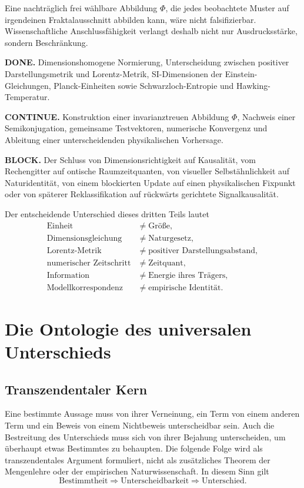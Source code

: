 \documentclass[11pt,a4paper]{article}
\theoremstyle{remark}
\newcommand{\statusbox}[2]{%
  \par\medskip\noindent
  \colorbox{#1}{\parbox{\dimexpr\linewidth-2\fboxsep\relax}{#2}}%
  \par\medskip
}
\begin{document}
Eine nachträglich frei wählbare Abbildung \(\Phi\), die jedes beobachtete
Muster auf irgendeinen Fraktalausschnitt abbilden kann, wäre nicht
falsifizierbar. Wissenschaftliche Anschlussfähigkeit verlangt deshalb nicht
nur Ausdrucksstärke, sondern Beschränkung.

\statusbox{QGreen}{
\textbf{DONE.}
Dimensionshomogene Normierung, Unterscheidung zwischen positiver
Darstellungsmetrik und Lorentz-Metrik, SI-Dimensionen der
Einstein-Gleichungen, Planck-Einheiten sowie Schwarzloch-Entropie und
Hawking-Temperatur.
}

\statusbox{QAmber}{
\textbf{CONTINUE.}
Konstruktion einer invarianztreuen Abbildung \(\Phi\), Nachweis einer
Semikonjugation, gemeinsame Testvektoren, numerische Konvergenz und Ableitung
einer unterscheidenden physikalischen Vorhersage.
}

\statusbox{QRed}{
\textbf{BLOCK.}
Der Schluss von Dimensionsrichtigkeit auf Kausalität, vom Rechengitter auf
ontische Raumzeitquanten, von visueller Selbstähnlichkeit auf Naturidentität,
von einem blockierten Update auf einen physikalischen Fixpunkt oder von
späterer Reklassifikation auf rückwärts gerichtete Signalkausalität.
}

Der entscheidende Unterschied dieses dritten Teils lautet
\[
\boxed{
\begin{aligned}
\text{Einheit}&\neq\text{Größe},\\
\text{Dimensionsgleichung}&\neq\text{Naturgesetz},\\
\text{Lorentz-Metrik}&\neq\text{positiver Darstellungsabstand},\\
\text{numerischer Zeitschritt}&\neq\text{Zeitquant},\\
\text{Information}&\neq\text{Energie ihres Trägers},\\
\text{Modellkorrespondenz}&\neq\text{empirische Identität}.
\end{aligned}}
\]

\section{Die Ontologie des universalen Unterschieds}
\label{sec:ontologie}

\subsection{Transzendentaler Kern}

Eine bestimmte Aussage muss von ihrer Verneinung, ein Term von einem anderen
Term und ein Beweis von einem Nichtbeweis unterscheidbar sein. Auch die
Bestreitung des Unterschieds muss sich von ihrer Bejahung unterscheiden, um
überhaupt etwas Bestimmtes zu behaupten. Die folgende Folge wird als
transzendentales Argument formuliert, nicht als zusätzliches Theorem der
Mengenlehre oder der empirischen Naturwissenschaft. In diesem Sinn gilt
\[
  \text{Bestimmtheit}
  \Longrightarrow
  \text{Unterscheidbarkeit}
  \Longrightarrow
  \text{Unterschied}.
\]
\end{document}
